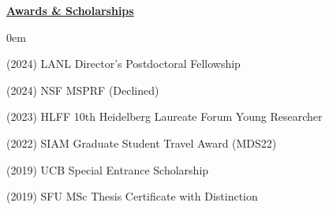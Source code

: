 \documentclass[letterpaper,11pt,oneside]{article}
\newcommand{\headr}[1]{\uline{\Large{\textbf{#1}} \hfill } \\ \vspace{-0.5cm}}
\begin{document}
\headr{Awards \& Scholarships}

\begin{enumerate}[label={[\arabic*]}]
\itemsep0em 
\item (2024) LANL Director's Postdoctoral Fellowship \hfill 
\item (2024) NSF MSPRF (Declined)\hfill  
\item (2023) HLFF 10th Heidelberg Laureate Forum Young Researcher \hfill 
\item (2022) SIAM Graduate Student Travel Award (MDS22) \hfill 
\item (2019) UCB Special Entrance Scholarship \hfill  
\item (2019) SFU MSc Thesis Certificate with Distinction \hfill 
\end{enumerate}

\end{document}
